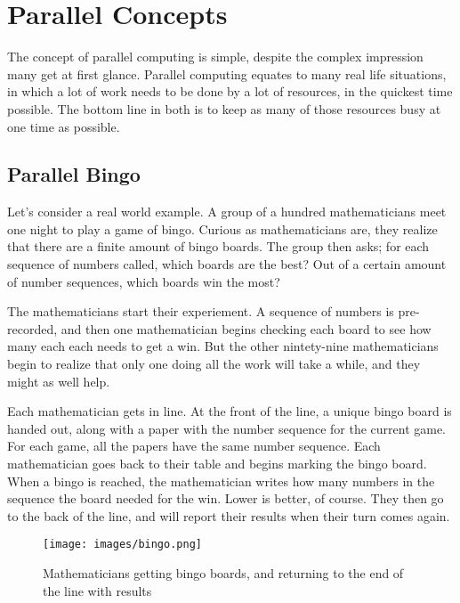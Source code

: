 \section{Parallel Concepts}
\label{sec:par_con}
The concept of parallel computing is simple, despite the complex impression many get at first glance.
Parallel computing equates to many real life situations, in which a lot of work needs to be done by a lot of 
resources, in the quickest time possible. The bottom line in both is to keep as many of those resources busy
at one time as possible.

\subsection{Parallel Bingo}
\label{sec:bingo}
Let's consider a real world example. A group of a hundred mathematicians meet one night to play a game of 
bingo. Curious as mathematicians are, they realize that there are a finite amount of bingo boards. The group
then asks; for each sequence of numbers called, which boards are the best? Out of a certain amount of 
number sequences, which boards win the most?

The mathematicians start their experiement. A sequence of numbers is pre-recorded, and then one 
mathematician begins checking each board to see how many each each needs to get a win. But the other 
nintety-nine mathematicians begin to realize that only one doing all the work will take a while, and they might
as well help.

Each mathematician gets in line. At the front of the line, a unique bingo board is handed out, along with a 
paper with the number sequence for the current game. For each game, all the papers have the same number 
sequence. Each mathematician goes back to their table and begins marking the bingo board. When a bingo is
reached, the mathematician writes how many numbers in the sequence the board needed for the win. Lower is
better, of course. They then go to the back of the line, and will report their results when their turn comes again.

\begin{figure}[h]
	\begin{center}
		\texttt{[image: images/bingo.png]}
		\caption{Mathematicians getting bingo boards, and returning to the end of the line with results} 
		\label{bingo}
	\end{center}
\end{figure}

